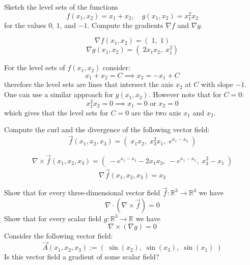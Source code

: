 \documentclass[11pt]{article}
\begin{document}
\def\hidesolutions{}


\begin{exercise}
	Sketch the level sets of the functions 
    \[
        f(x_1,x_2) = x_1 + x_2, \quad g(x_1,x_2) = x_1^2 x_2 
    \]
    for the values $0$, $1$, and $-1$.
    Compute the gradients $\nabla f$ and  $\nabla g$.
\end{exercise}

\begin{solution}
    \[
        \nabla f(x_1,x_2) = \left( \; 1,  \; 1 \right)
    \]
    \[
        \nabla g(x_1,x_2) = \left( \; 2x_1x_2,  \; x_1^2 \right)
    \]

For the level sets of $f(x_1,x_2)$ consider:
    \[
        x_1 + x_2 = C \implies x_2 = -x_1 + C
    \]
therefore the level sets are lines that intersect the axis $x_2$ at $C$ with slope $-1$. One can use a similar approach for $g(x_1,x_2)$. However note that for $C =0$:
    \[
        x_1^2 x_2 = 0 \implies x_1 =0 \text{ or } x_2 = 0
    \]
which gives that the level sets for $C = 0$ are the two axis $x_1$ and $x_2$. 
\end{solution}


\begin{exercise}
	Compute the curl and the divergence of the following vector field:
    \[
        \vec{f}(x_1,x_2,x_3) = \left( \; x_1 x_2, \; x_3^2 x_1,\;  e^{x_1 - x_2} \; \right)
    \]
\end{exercise}

\begin{solution}
    \[
        \nabla \times \vec{f}(x_1,x_2,x_3) = \left( \; -e^{x_1-x_2} - 2x_1x_3, \; -e^{x_1-x_2},\;  x_3^2 - x_1 \; \right)
    \]
   \[
        \nabla \dot \vec{f}(x_1,x_2,x_3) = x_2
    \]
\end{solution}





\begin{exercise}
	Show that for every three-dimensional vector field $\vec{f} \colon \mathbb{R}^3 \to \mathbb{R}^3$ we have 
    \[
        \nabla \cdot \left( \nabla \times \vec{f} \right) = 0
    \]
    Show that for every scalar field $g \colon \mathbb{R}^3 \to \mathbb{R}$ we have 
    \[
        \nabla \times \left( \nabla g \right) = 0
    \]
    Consider the following vector field:
    \[
        \vec{A}(x_1,x_2,x_3) := \left( \; \sin(x_2),  \; \sin(x_3), \; \sin(x_1) \; \right)
    \]
    Is this vector field a gradient of some scalar field?
\end{exercise}
\end{document}
